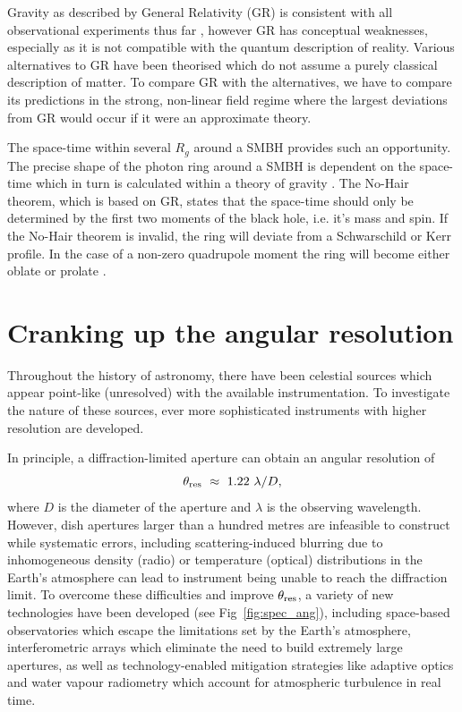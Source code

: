 Gravity as described by General Relativity (GR) is consistent with all observational experiments thus far \citep[e.g.][]{Kramer_2006}, however GR has conceptual weaknesses, especially as it is not compatible with the quantum description of reality. Various alternatives to GR have been theorised which do not assume a purely classical description of matter. To compare GR with the alternatives, we have to compare its predictions in the strong, non-linear field regime where the largest deviations from GR would occur if it were an approximate theory.


The space-time within several $R_g$ around a SMBH provides such an opportunity. The precise shape of the photon ring around a SMBH is dependent on the space-time which in turn is calculated within a theory of gravity \citep{Takahashi_2004}. The No-Hair theorem, which is based on GR, states that the space-time should only be determined by the first two moments of the black hole, i.e. it's mass and spin. If the No-Hair theorem is invalid, the ring will deviate from a Schwarschild or Kerr profile. In the case of a non-zero quadrupole moment the ring will become either oblate or prolate \citep{Johannsen_2010}. 

\section{Cranking up the angular resolution}
Throughout the history of astronomy, there have been celestial sources which appear point-like (unresolved) with the available instrumentation. To investigate the nature of these sources, ever more sophisticated instruments with higher resolution are developed. 

In principle, a diffraction-limited aperture can obtain an angular resolution of
\begin{equation}\label{eq:ang_res}
 \theta_{\rm res}\ \approx \ 1.22\ \lambda / D,
\end{equation}
where $D$ is the diameter of the aperture and $\lambda$ is the observing wavelength. However, dish apertures larger than a hundred metres are infeasible to construct while systematic errors, including scattering-induced blurring due to inhomogeneous density (radio) or temperature (optical) distributions in the Earth's atmosphere can lead to instrument being unable to reach the diffraction limit. To overcome these difficulties and improve $\theta_{\rm res}$, a variety of new technologies have been developed (see Fig~\ref{fig:spec_ang}), including space-based observatories which escape the limitations set by the Earth's atmosphere, interferometric arrays which eliminate the need to build extremely large apertures, as well as technology-enabled mitigation strategies like adaptive optics and water vapour radiometry which account for atmospheric turbulence in real time. 


